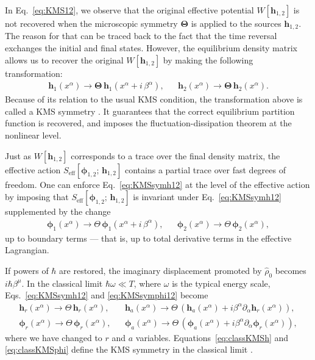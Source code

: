 \documentclass[aps,prd,nofootinbib,amsmath,amssymb,showpacs,longbibliography,singlecolumn,superscriptaddress,notitlepage]{revtex4-1}
\theoremstyle{plain}
\theoremstyle{definition}
\newcommand{\cvec}[1]{\ensuremath{\bm {#1}}}
\begin{document}
In Eq.~\eqref{eq:KMS12}, we observe that the original effective potential $W[\cvec{h}_{1,2}]$ is not recovered when the microscopic symmetry ${\bm\Theta}$ is applied to the sources $\cvec{h}_{1,2}$. 
The reason for that can be traced back to the fact that the time reversal exchanges the initial and final states. However, the equilibrium density matrix allows us to recover the original $W[\cvec{h}_{1,2}]$ by making the following transformation:
\begin{align}\label{eq:KMSsymh12}
    &\cvec{h}_1(x^\alpha) \to {\bm\Theta} \,\cvec{h}_1(x^\alpha + i\, \beta^\alpha),&
    &\cvec{h}_2(x^\alpha) \to {\bm\Theta} \,\cvec{h}_2(x^\alpha).&
\end{align}
Because of its relation to the usual KMS condition, the transformation above is called a KMS symmetry \cite{Crossley:2015evo, Sieberer:2015hba, Glorioso:2017fpd, Liu:2018kfw}. It guarantees that the correct equilibrium partition function is recovered, and imposes the fluctuation-dissipation theorem at the nonlinear level. 

Just as $W[\cvec{h}_{1,2}]$ corresponds to a trace over the final density matrix, the effective action $S_{\textrm{eff}}[\cvec{\phi}_{1,2};\,\cvec{h}_{1,2}]$ contains a partial trace over fast degrees of freedom. 
One can enforce Eq.~\eqref{eq:KMSsymh12} at the level of the effective action by imposing that $S_{\textrm{eff}}[\cvec{\phi}_{1,2};\,\cvec{h}_{1,2}]$ is invariant under Eq.~\eqref{eq:KMSsymh12} supplemented by the change
\begin{align}\label{eq:KMSsymphi12}
    &\cvec{\phi}_1(x^\alpha) \to \Theta \,\cvec{\phi}_1(x^\alpha + i\, \beta^\alpha),&
    &\cvec{\phi}_2(x^\alpha) \to \Theta \,\cvec{\phi}_2(x^\alpha),&
\end{align}
up to boundary terms --- that is, up to total derivative terms in the effective Lagrangian.

If powers of $\hbar$ are restored, the imaginary displacement promoted by $\hat \rho_0$ becomes  $i\hbar\beta^\mu$. In the classical limit $ \hbar\omega\ll  T$, where $\omega$ is the typical energy scale, Eqs.~\eqref{eq:KMSsymh12} and \eqref{eq:KMSsymphi12} become
\begin{align}
    &\cvec{h}_r(x^\alpha) \to \Theta \,\cvec{h}_r(x^\alpha),&
    &\cvec{h}_a(x^\alpha) \to \Theta \,\left(\cvec{h}_a(x^\alpha) + i\beta^\alpha\partial_\alpha \cvec{h}_r(x^\alpha)\right),&
    \label{eq:classKMSh}
    \\
    &\cvec{\phi}_r(x^\alpha) \to \Theta \,\cvec{\phi}_r(x^\alpha),&
    &\cvec{\phi}_a(x^\alpha) \to \Theta \,\left(\cvec{\phi}_a(x^\alpha) + i\beta^\alpha\partial_\alpha \cvec{\phi}_r(x^\alpha)\right),&
    \label{eq:classKMSphi}
\end{align}
where we have changed to $r$ and $a$ variables. Equations~\eqref{eq:classKMSh} and \eqref{eq:classKMSphi} define the KMS symmetry in the classical limit \cite{Crossley:2015evo, Sieberer:2015hba, Glorioso:2017fpd, Liu:2018kfw}.




\end{document}
